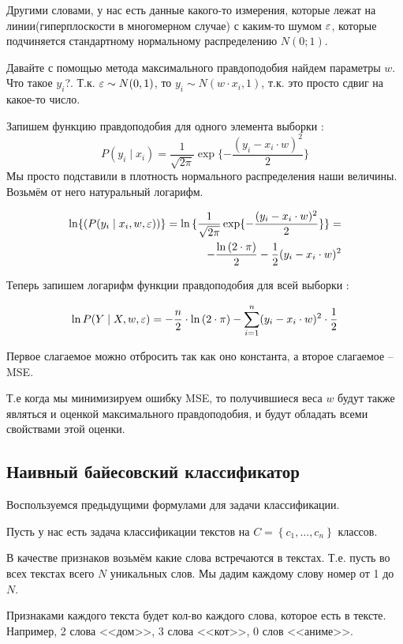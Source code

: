 Другими словами, у нас есть данные какого-то измерения, которые лежат на линии(гиперплоскости в многомерном случае) с каким-то шумом $\varepsilon$, которые подчиняется стандартному нормальному распределению $N(0;1)$.

Давайте с помощью метода максимального правдоподобия найдем параметры $w$. Что такое $y_{i}$?. Т.к. $\varepsilon \sim N(0, 1)$, то $y_{i} \sim N(w \cdot x_{i}, 1)$, т.к. это просто сдвиг на какое-то число.

Запишем функцию правдоподобия для одного элемента выборки :
$$P(y_{i} \mid x_{i}) = \frac{1}{\sqrt{2 \pi}}\exp\{{-\frac{(y_{i} - x_{i} \cdot w) ^ {2}}{2}}\}$$
Мы просто подставили в плотность нормального распределения наши величины. Возьмём от него натуральный логарифм.

\begin{eqnarray*}
\ln\{{(P(y_{i} \mid x_{i}, w, \varepsilon))}\} = \ln{\{\frac{1}{\sqrt{2 \pi}}\exp\{{-\frac{(y_{i} - x_{i} \cdot w) ^ {2}}{2}}\}\}}=
\\
-\frac{\ln{(2 \cdot \pi)}}{2} - \frac{1}{2}(y_{i} - x_{i} \cdot w)^2
\end{eqnarray*}

Теперь запишем логарифм функции правдоподобия для всей выборки :

$$\ln P(Y \mid X, w, \varepsilon) = -\frac{n}{2} \cdot \ln{(2 \cdot \pi)} - \sum_{i = 1}^{n}(y_{i} - x_{i} \cdot w)^{2} \cdot \frac{1}{2}$$

Первое слагаемое можно отбросить так как оно константа, а второе слагаемое -- MSE.

Т.е когда мы минимизируем ошибку MSE, то получившиеся веса $w$ будут также являться и оценкой максимального правдоподобия, и будут обладать всеми свойствами этой оценки.

\subsection{Наивный байесовский классификатор}

Воспользуемся предыдущими формулами для задачи классификации.

Пусть у нас есть задача классификации текстов на $C=\left\{c_{1}, \ldots, c_{n}\right\}$ классов. 

В качестве признаков возьмём какие слова встречаются в текстах. Т.е. пусть во всех текстах всего $N$ уникальных слов. Мы дадим каждому слову номер от 1 до $N$. 

Признаками каждого текста будет кол-во каждого слова, которое есть в тексте. Например, 2 слова <<дом>>, 3 слова <<кот>>, 0 слов <<аниме>>. 

